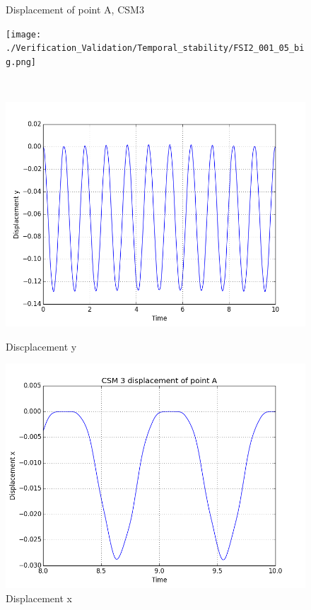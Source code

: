 \begin{figure}[H]  \label{CSM3_plots} 
  \caption {Displacement of point A, CSM3}
  \begin{minipage}[b]{0.5\linewidth}
    \centering
    \texttt{[image: ./Verification\_Validation/Temporal\_stability/FSI2\_001\_05\_big.png]} 
    \caption{$ $} 
    \vspace{4ex}
  \end{minipage}%
  \begin{minipage}[b]{0.5\linewidth}
    \centering
    \includegraphics[width=.75\linewidth]{./Verification_Validation//Hron_Turek/dis_y.png} 
    \caption{Discplacement y} 
    \vspace{4ex}
  \end{minipage} 
  \begin{minipage}[b]{0.5\linewidth}
    \centering
    \includegraphics[width=.75\linewidth]{./Verification_Validation//Hron_Turek/dis_x_short.png} 
    \caption{Displacement x} 
    \vspace{4ex}
  \end{minipage}%
  \begin{minipage}[b]{0.5\linewidth}

\end{minipage}
\end{figure}
